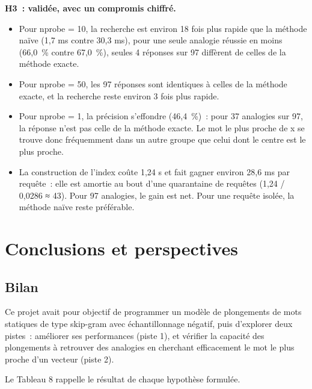 \documentclass[11pt,a4paper]{article}
\begin{document}
\textbf{H3~: validée, avec un compromis chiffré.}\nopagebreak

\begin{itemize}

\item Pour nprobe = 10, la recherche est environ 18 fois plus rapide que la méthode naïve (1,7 ms contre 30,3 ms), pour une seule analogie réussie en moins (66,0~\% contre 67,0~\%), seules 4 réponses sur 97 diffèrent de celles de la méthode exacte.

\item Pour nprobe = 50, les 97 réponses sont identiques à celles de la méthode exacte, et la recherche reste environ 3 fois plus rapide.

\item Pour nprobe = 1, la précision s’effondre (46,4~\%)~: pour 37 analogies sur 97, la réponse n’est pas celle de la méthode exacte. Le mot le plus proche de x se trouve donc fréquemment dans un autre groupe que celui dont le centre est le plus proche.

\item La construction de l’index coûte 1,24 s et fait gagner environ 28,6 ms par requête~: elle est amortie au bout d’une quarantaine de requêtes (1,24 / 0,0286 ≈ 43). Pour 97 analogies, le gain est net. Pour une requête isolée, la méthode naïve reste préférable.

\end{itemize}

\section{Conclusions et perspectives}

\subsection{Bilan}

Ce projet avait pour objectif de programmer un modèle de plongements de mots statiques de type skip-gram avec échantillonnage négatif, puis d’explorer deux pistes~: améliorer ses performances (piste 1), et vérifier la capacité des plongements à retrouver des analogies en cherchant efficacement le mot le plus proche d’un vecteur (piste 2).

Le Tableau 8 rappelle le résultat de chaque hypothèse formulée.
\end{document}

